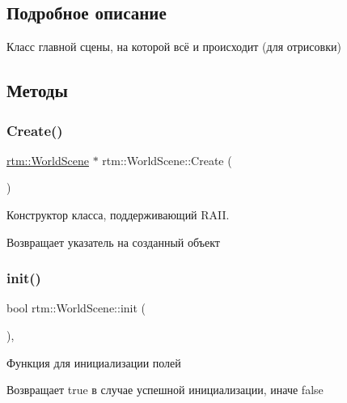 \subsection{Подробное описание}
Класс главной сцены, на которой всё и происходит (для отрисовки) 

\subsection{Методы}
\mbox{\label{classrtm_1_1_world_scene_a4d9c6dcf1fc6a02c1d090caed0ad6745}} 
\subsubsection{\texorpdfstring{Create()}{Create()}}
{\footnotesize\ttfamily \hyperlink{classrtm_1_1_world_scene}{rtm\+::\+World\+Scene} $\ast$ rtm\+::\+World\+Scene\+::\+Create (\begin{DoxyParamCaption}{ }\end{DoxyParamCaption})\hspace{0.3cm}{\ttfamily [static]}}



Конструктор класса, поддерживающий R\+A\+II. 

\begin{DoxyReturn}{Возвращает}
указатель на созданный объект 
\end{DoxyReturn}
\mbox{\label{classrtm_1_1_world_scene_a53da1782e50b99e90831bceb54c69ab9}} 
\subsubsection{\texorpdfstring{init()}{init()}}
{\footnotesize\ttfamily bool rtm\+::\+World\+Scene\+::init (\begin{DoxyParamCaption}{ }\end{DoxyParamCaption})\hspace{0.3cm}{\ttfamily [override]}, {\ttfamily [virtual]}}



Функция для инициализации полей 

\begin{DoxyReturn}{Возвращает}
true в случае успешной инициализации, иначе false 
\end{DoxyReturn}
\mbox{\label{classrtm_1_1_world_scene_a243c2d00cc0e525738b099eea7120fba}} 
